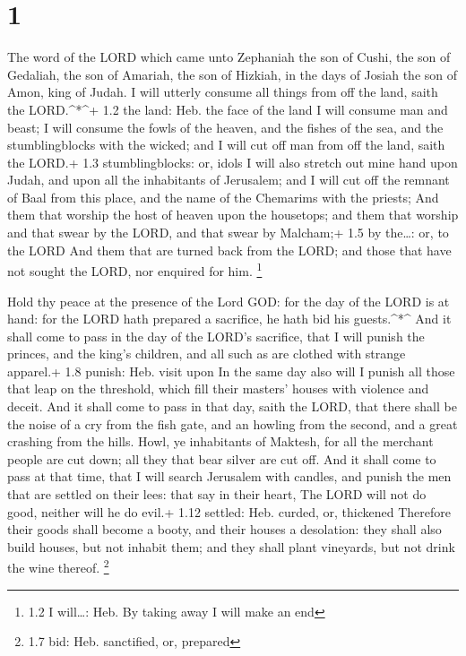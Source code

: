 \hypertarget{section}{%
\section{1}\label{section}}

 The word of the LORD which came unto Zephaniah the son of
Cushi, the son of Gedaliah, the son of Amariah, the son of Hizkiah, in
the days of Josiah the son of Amon, king of Judah.  I will
utterly consume all things from off the land, saith the LORD.\^{}*\^{}+
1.2 the land: Heb. the face of the land  I will consume man
and beast; I will consume the fowls of the heaven, and the fishes of the
sea, and the stumblingblocks with the wicked; and I will cut off man
from off the land, saith the LORD.+ 1.3 stumblingblocks: or, idols
 I will also stretch out mine hand upon Judah, and upon all
the inhabitants of Jerusalem; and I will cut off the remnant of Baal
from this place, and the name of the Chemarims with the priests;
 And them that worship the host of heaven upon the
housetops; and them that worship and that swear by the LORD, and that
swear by Malcham;+ 1.5 by the\ldots: or, to the LORD  And
them that are turned back from the LORD; and those that have not sought
the LORD, nor enquired for him. \footnote{1.2 I will\ldots: Heb. By
  taking away I will make an end}

 Hold thy peace at the presence of the Lord GOD: for the day
of the LORD is at hand: for the LORD hath prepared a sacrifice, he hath
bid his guests.\^{}*\^{}  And it shall come to pass in the
day of the LORD's sacrifice, that I will punish the princes, and the
king's children, and all such as are clothed with strange apparel.+ 1.8
punish: Heb. visit upon  In the same day also will I punish
all those that leap on the threshold, which fill their masters' houses
with violence and deceit.  And it shall come to pass in
that day, saith the LORD, that there shall be the noise of a cry from
the fish gate, and an howling from the second, and a great crashing from
the hills.  Howl, ye inhabitants of Maktesh, for all the
merchant people are cut down; all they that bear silver are cut off.
 And it shall come to pass at that time, that I will search
Jerusalem with candles, and punish the men that are settled on their
lees: that say in their heart, The LORD will not do good, neither will
he do evil.+ 1.12 settled: Heb. curded, or, thickened 
Therefore their goods shall become a booty, and their houses a
desolation: they shall also build houses, but not inhabit them; and they
shall plant vineyards, but not drink the wine thereof. \footnote{1.7
  bid: Heb. sanctified, or, prepared}

